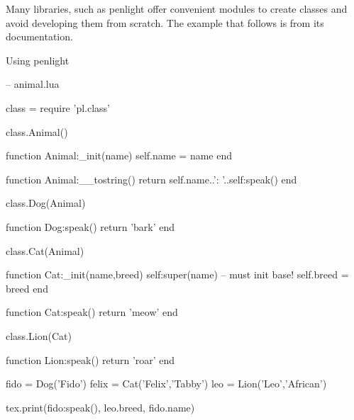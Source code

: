 Many libraries, such as penlight offer convenient modules to create classes and avoid developing them from scratch. The example that follows is from its documentation.

\begin{texexample}{Using penlight}{}
\begin{luacode}

-- animal.lua

class = require 'pl.class'

class.Animal()

function Animal:_init(name)
    self.name = name
end

function Animal:__tostring()
  return self.name..': '..self:speak()
end

class.Dog(Animal)

function Dog:speak()
  return 'bark'
end

class.Cat(Animal)

function Cat:_init(name,breed)
    self:super(name)  -- must init base!
    self.breed = breed
end

function Cat:speak()
  return 'meow'
end

class.Lion(Cat)

function Lion:speak()
  return 'roar'
end

fido = Dog('Fido')
felix = Cat('Felix','Tabby')
leo = Lion('Leo','African')

tex.print(fido:speak(), leo.breed, fido.name)
\end{luacode}
\end{texexample}









